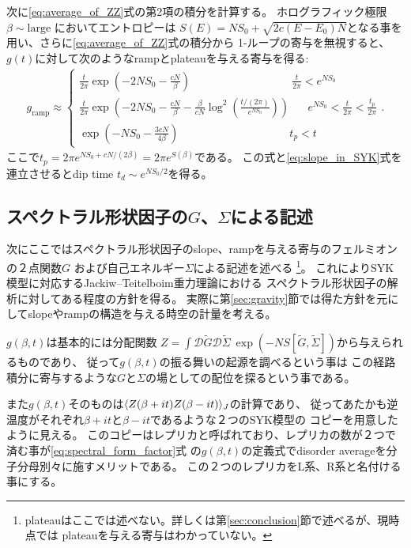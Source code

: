 次に\eqref{eq:average_of_ZZ}式の第2項の積分を計算する。
ホログラフィック極限$\beta \sim \mathrm{large}$ においてエントロピーは
$S(E) = NS_0 + \sqrt{2c(E-E_0)N}$となる事を用い、さらに\eqref{eq:average_of_ZZ}式の積分から
1-ループの寄与を無視すると、$g(t)$に対して次のようなrampとplateauを与える寄与を得る:
\begin{align}
	g_{\mathrm{ramp}}\approx\left\{
		\begin{array}{l}
			\frac{t}{2\pi}\exp\left(-2NS_0 - \frac{cN}{\beta}\right)
				\hspace{110pt}\frac{t}{2\pi} < e^{NS_0}\\
			\frac{t}{2\pi}\exp\left(-2NS_0 - \frac{cN}{\beta}
			- \frac{\beta}{cN}\log^2\left(\frac{t/(2\pi)}{e^{NS_0}}\right)\right)
				\hspace{20pt}e^{NS_0} < \frac{t}{2\pi} < \frac{t_p}{2\pi}\\
			\exp\left(-NS_0 - \frac{3cN}{4\beta}\right)
				\hspace{120pt}t_p < t
		\end{array}		
	\right. .
	\label{eq:SYK_ramp_and_plateau_contribution}
\end{align}
ここで$t_p = 2\pi e^{NS_0 + cN/(2\beta)} = 2\pi e^{S(\beta)}$である。
この式と\eqref{eq:slope_in_SYK}式を連立させるとdip time $t_d \sim e^{NS_0/2}$を得る。

\subsection{スペクトラル形状因子の$G$、$\Sigma$による記述}
次にここではスペクトラル形状因子のslope、rampを与える寄与のフェルミオンの２点関数$G$
および自己エネルギー$\Sigma$による記述を述べる
\footnote{plateauはここでは述べない。詳しくは第\ref{sec:conclusion}節で述べるが、現時点では
plateauを与える寄与はわかっていない。}。
これによりSYK模型に対応するJackiw--Teitelboim重力理論における
スペクトラル形状因子の解析に対してある程度の方針を得る。
実際に第\ref{sec:gravity}節では得た方針を元にしてslopeやrampの構造を与える時空の計量を考える。

$g(\beta, t)$は基本的には分配関数
$Z = \int \mathcal{D}\tilde{G}\mathcal{D}\tilde{\Sigma}\ 
\exp(-NS[\tilde{G}, \tilde{\Sigma}])$から与えられるものであり、
従って$g(\beta, t)$の振る舞いの起源を調べるという事は
この経路積分に寄与するような$G$と$\Sigma$の場としての配位を探るという事である。

また$g(\beta, t)$そのものは$\langle Z(\beta + it)Z(\beta - it) \rangle_J$の計算であり、
従ってあたかも逆温度がそれぞれ$\beta + it$と$\beta - it$であるような２つのSYK模型の
コピーを用意したように見える。
このコピーはレプリカと呼ばれており、レプリカの数が２つで済む事が\eqref{eq:spectral_form_factor}式
の$g(\beta, t)$の定義式でdisorder averageを分子分母別々に施すメリットである。
この２つのレプリカをL系、R系と名付ける事にする。

